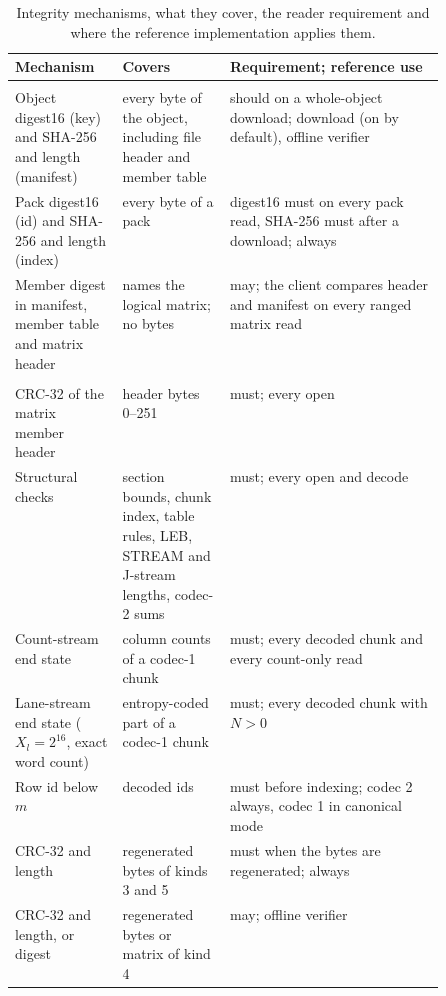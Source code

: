 \begin{table}[htbp]
\centering\footnotesize\setlength{\tabcolsep}{4pt}
\caption{Integrity mechanisms, what they cover, the reader requirement and where the reference implementation applies
them.}
\label{spec:tab:integrity}
\begin{tabularx}{\linewidth}{@{}>{\raggedright\arraybackslash}p{0.25\linewidth}>{\raggedright\arraybackslash}p{0.25\linewidth}X@{}}
\toprule
Mechanism & Covers & Requirement; reference use \\
\midrule
\multicolumn{3}{@{}l}{\emph{Object identity}} \\
Object digest16 (key) and SHA-256 and length (manifest) & every byte of the object, including file header and member table & should on a whole-object download; download (on by default), offline verifier \\
Pack digest16 (id) and SHA-256 and length (index) & every byte of a pack & digest16 must on every pack read, SHA-256 must after a download; always \\
Member digest in manifest, member table and matrix header & names the logical matrix; no bytes & may; the client compares header and manifest on every ranged matrix read \\
\midrule
\multicolumn{3}{@{}l}{\emph{Byte integrity}} \\
CRC-32 of the matrix member header & header bytes 0--251 & must; every open \\
Structural checks & section bounds, chunk index, table rules, LEB, STREAM and J-stream lengths, codec-2 sums & must; every open and decode \\
Count-stream end state & column counts of a codec-1 chunk & must; every decoded chunk and every count-only read \\
Lane-stream end state ($X_l=2^{16}$, exact word count) & entropy-coded part of a codec-1 chunk & must; every decoded chunk with $N>0$ \\
Row id below $m$ & decoded ids & must before indexing; codec 2 always, codec 1 in canonical mode \\
CRC-32 and length & regenerated bytes of kinds 3 and 5 & must when the bytes are regenerated; always \\
CRC-32 and length, or digest & regenerated bytes or matrix of kind 4 & may; offline verifier \\

\end{tabularx}
\end{table}
